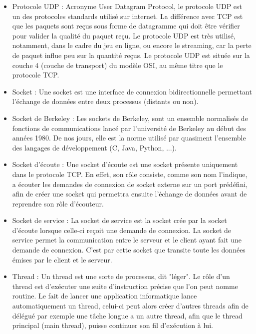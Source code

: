 \begin{appendices}
\begin{itemize}
	\item Protocole UDP :
    Acronyme User Datagram Protocol, le protocole UDP est un des protocoles standards utilisé sur internet. 
    La différence avec TCP est que les paquets sont reçus sous forme de datagramme qui doit être vérifier pour valider la qualité du paquet reçu.
    Le protocole UDP est très utilisé, notamment, dans le cadre du jeu en ligne, ou encore le streaming, car la perte de paquet influe peu sur la quantité reçus.
    Le protocole UDP est située sur la couche 4 (couche de transport) du modèle OSI, au même titre que le protocole TCP. 
   \newline

	\item Socket :
    Une socket est une interface de connexion bidirectionnelle permettant l'échange de données entre deux processus (distants ou non).
	\newline
 
	\item Socket de Berkeley :
    Les sockets de Berkeley, sont un ensemble normalisés de fonctions de communications lancé par l'université de Berkeley au début des années 1980.
    De nos jours, elle est la norme utilisé par quasiment l'ensemble des langages de développement (C, Java, Python, ...).
    \newline
  
	\item Socket d'écoute :
    Une socket d'écoute est une socket présente uniquement dans le protocole TCP. En effet, son rôle consiste, comme son nom l'indique, a écouter les demandes de connexion de socket externe sur un port prédéfini, afin de créer une socket qui permettra ensuite l'échange de données avant de reprendre son rôle d'écouteur.
	\newline
  
	\item Socket de service :
    La socket de service est la socket crée par la socket d'écoute lorsque celle-ci reçoit une demande de connexion. La socket de service permet la communication entre le serveur et le client ayant fait une demande de connexion. C'est par cette socket que transite toute les données émises par le client et le serveur.
	\newline
  
	\item Thread :
	Un thread est une sorte de processus, dit "léger". Le rôle d'un thread est d'exécuter une suite d'instruction précise que l'on peut nomme routine.
	Le fait de lancer une application informatique lance automatiquement un thread, celui-ci peut alors créer d'autres threads afin de délégué par exemple une tâche longue a un autre thread, afin que le thread principal (main thread), puisse continuer son fil d'exécution à lui.
	\newline


\end{itemize}
\end{appendices}
